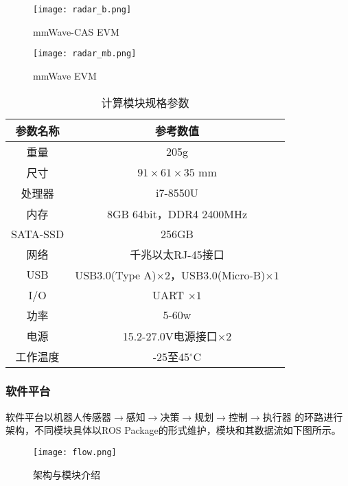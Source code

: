 \documentclass[lang=cn,11pt,a4paper]{elegantpaper}
\begin{document}
\begin{figure}
  \centering
  \texttt{[image: radar\_b.png]}
  \caption{mmWave-CAS EVM}\label{fig:CAS}
\end{figure}

\begin{figure}
  \centering
  \texttt{[image: radar\_mb.png]}
  \caption{mmWave EVM}\label{fig:mini}
\end{figure}
  

\begin{table}[!htbp]
  \centering
  \caption{计算模块规格参数}
  \begin{tabular}{cc}
    \toprule
    参数名称  & 参考数值  \\
    \midrule
    重量  & 205g   \\
    尺寸 & $91 \times 61 \times 35$ mm  \\
    处理器 &  i7-8550U \\
    内存 & 8GB 64bit，DDR4 2400MHz \\
    SATA-SSD & 256GB\\
    网络 & 千兆以太RJ-45接口\\
    USB & USB3.0(Type A)$\times 2$，USB3.0(Micro-B)$\times 1$ \\
    I/O & UART $\times 1$  \\
    功率 & 5-60w \\
    电源 & 15.2-27.0V电源接口$\times 2$  \\
    工作温度 & -25至45$^{\circ}$C\\
  \bottomrule
  \end{tabular}%
\end{table}%

\subsubsection{软件平台}

软件平台以机器人传感器$\rightarrow$感知$\rightarrow$决策$\rightarrow$规划$\rightarrow$控制$\rightarrow$执行器 的环路进行架构，不同模块具体以ROS Package的形式维护，模块和其数据流如下图所示。
\begin{figure}
  \centering
  \texttt{[image: flow.png]}
  \caption{架构与模块介绍}\label{fig:flow}
\end{figure}
\end{document}
